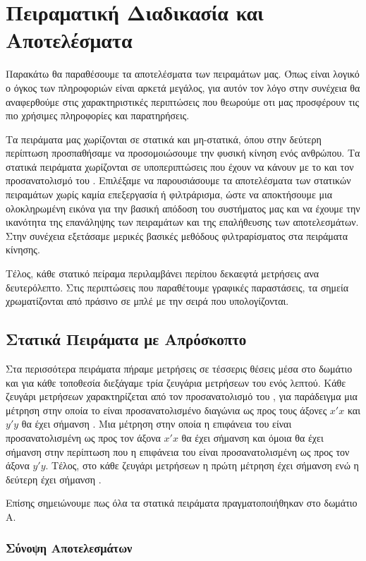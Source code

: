 \chapter{Πειραματική Διαδικασία και Αποτελέσματα}
Παρακάτω θα παραθέσουμε τα αποτελέσματα των πειραμάτων μας. Όπως είναι λογικό ο όγκος των πληροφοριών είναι αρκετά μεγάλος, για αυτόν τον λόγο
στην συνέχεια θα αναφερθούμε στις χαρακτηριστικές περιπτώσεις που θεωρούμε οτι μας προσφέρουν τις πιο χρήσιμες πληροφορίες και παρατηρήσεις.

Τα πειράματα μας χωρίζονται σε στατικά και μη-στατικά, όπου στην δεύτερη περίπτωση προσπαθήσαμε να προσομοιώσουμε την φυσική
κίνηση ενός ανθρώπου. Τα στατικά πειράματα χωρίζονται σε υποπεριπτώσεις που έχουν να κάνουν με το  και τον
προσανατολισμό του . Επιλέξαμε να παρουσιάσουμε τα αποτελέσματα των στατικών πειραμάτων χωρίς καμία επεξεργασία ή φιλτράρισμα, ώστε
να αποκτήσουμε μια ολοκληρωμένη εικόνα για την βασική απόδοση του συστήματος μας και να έχουμε την ικανότητα
της επανάληψης των πειραμάτων και της επαλήθευσης των αποτελεσμάτων. Στην συνέχεια εξετάσαμε μερικές βασικές μεθόδους φιλτραρίσματος
στα πειράματα κίνησης.

Τέλος, κάθε στατικό πείραμα περιλαμβάνει περίπου δεκαεφτά μετρήσεις ανα δευτερόλεπτο. Στις περιπτώσεις που παραθέτουμε γραφικές
παραστάσεις, τα σημεία χρωματίζονται από πράσινο σε μπλέ με την σειρά που υπολογίζονται.

\section{Στατικά Πειράματα με Απρόσκοπτο }
Στα περισσότερα πειράματα πήραμε μετρήσεις σε τέσσερις θέσεις μέσα στο δωμάτιο και για κάθε τοποθεσία διεξάγαμε τρία ζευγάρια μετρήσεων
του ενός λεπτού. Κάθε ζευγάρι μετρήσεων χαρακτηρίζεται από τον προσανατολισμό του , για παράδειγμα μια μέτρηση στην οποία το  είναι
προσανατολισμένο διαγώνια ως προς τους άξονες \(x'x\) και \(y'y\) θα έχει σήμανση . Μια μέτρηση στην οποία η επιφάνεια του  είναι
προσανατολισμένη ως προς τον άξονα \(x'x\) θα έχει σήμανση  και όμοια θα έχει σήμανση  στην περίπτωση που η επιφάνεια του 
είναι προσανατολισμένη ως προς τον άξονα \(y'y\).
Τέλος, στο κάθε ζευγάρι μετρήσεων η πρώτη μέτρηση έχει σήμανση  ενώ η δεύτερη έχει σήμανση .

Επίσης σημειώνουμε πως όλα τα στατικά πειράματα πραγματοποιήθηκαν στο δωμάτιο Α.
\subsection{Σύνοψη Αποτελεσμάτων}

